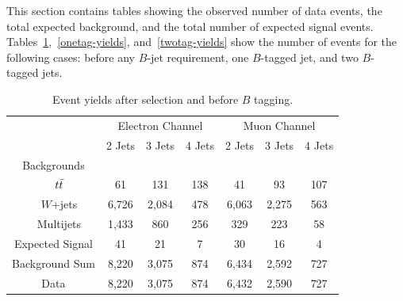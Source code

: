 This section contains tables showing the observed number of data events, the total expected background, and the total number of expected signal events. Tables~\ref{pretag-yields},~\ref{onetag-yields}, and~\ref{twotag-yields} show the number of events for the following cases: before any $B$-jet requirement, one $B$-tagged jet, and two $B$-tagged jets.

\begin{table}[!h!tbp]
\begin{center}
\caption{Event yields after selection and before $B$ tagging.}
\label{pretag-yields}
\begin{tabular}{c|ccc|ccc}
& \multicolumn{3}{c|}{Electron Channel} & \multicolumn{3}{c}{Muon Channel} \\
    				& 2 Jets	& 3 Jets	& 4 Jets	& 2 Jets	& 3 Jets	& 4 Jets \\
\hline
Backgrounds              &        	&       	&       	&       	&    	  	&      		\\
~~$\mbox{$t\bar{t}$}$			&	61	&	131	&	138	&	41	&	93	&	107	\\
~~$W$+jets		& 6,726	& 2,084	& 478	& 6,063	& 2,275	& 563	\\
~~Multijets		&	1,433 &   860 	&   256 	&	329 &   223 &   58	\\
\hline
Expected Signal	& 41		& 21		& 7		& 30		& 16		& 4	\\
Background Sum    	& 8,220 	& 3,075 	&   874 	& 6,434 	& 2,592 	& 727 \\
\hline
Data                     	&	8,220 & 3,075 	&   874 	&	6,432 & 2,590 &  727 \\
\end{tabular}
\vspace{-0.1in}
\end{center}
\end{table}

